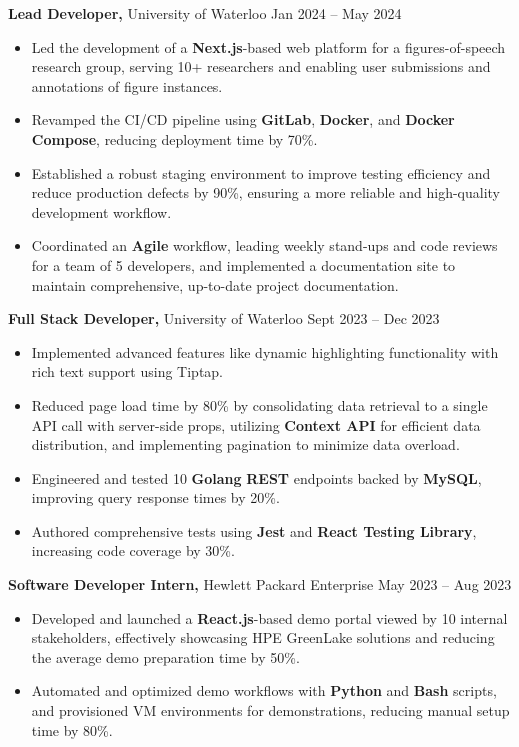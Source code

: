 \textbf{Lead Developer,} {University of Waterloo}  \hfill Jan 2024 -- May 2024 \\
\vspace{-9pt}
\begin{itemize}
  \item Led the development of a \textbf{Next.js}-based web platform for a figures-of-speech research group, serving 10+ researchers and enabling user submissions and annotations of figure instances.
  \item Revamped the CI/CD pipeline using \textbf{GitLab}, \textbf{Docker}, and \textbf{Docker Compose}, reducing deployment time by 70\%.
  \item Established a robust staging environment to improve testing efficiency and reduce production defects by 90\%, ensuring a more reliable and high-quality development workflow.
  \item Coordinated an \textbf{Agile} workflow, leading weekly stand-ups and code reviews for a team of 5 developers, and implemented a documentation site to maintain comprehensive, up-to-date project documentation.
\end{itemize}

\textbf{Full Stack Developer,} {University of Waterloo}  \hfill Sept 2023 -- Dec 2023 \\
\vspace{-9pt}
\begin{itemize}
  \item Implemented advanced features like dynamic highlighting functionality with rich text support using Tiptap.
  \item Reduced page load time by 80\% by consolidating data retrieval to a single API call with server-side props, utilizing \textbf{Context API} for efficient data distribution, and implementing pagination to minimize data overload.
  \item Engineered and tested 10 \textbf{Golang} \textbf{REST} endpoints backed by \textbf{MySQL}, improving query response times by 20\%.
  \item Authored comprehensive tests using \textbf{Jest} and \textbf{React Testing Library}, increasing code coverage by 30\%.
\end{itemize}

\textbf{Software Developer Intern,} {Hewlett Packard Enterprise}  \hfill May 2023 -- Aug 2023 \\
\vspace{-9pt}
\begin{itemize}
  \item Developed and launched a \textbf{React.js}-based demo portal viewed by 10 internal stakeholders, effectively showcasing HPE GreenLake solutions and reducing the average demo preparation time by 50\%.
  \item Automated and optimized demo workflows with \textbf{Python} and \textbf{Bash} scripts, and provisioned VM environments for demonstrations, reducing manual setup time by 80\%.
\end{itemize}

